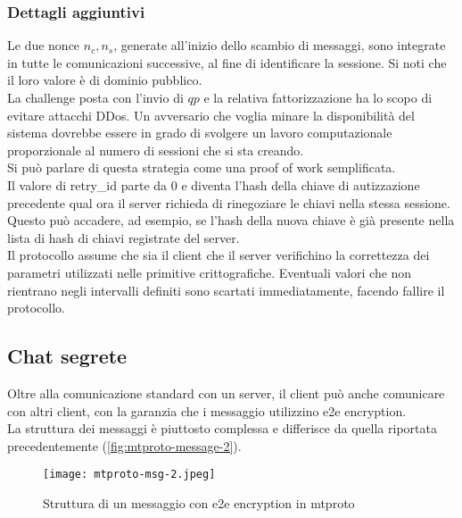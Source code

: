 

\subsubsection{Dettagli aggiuntivi}
Le due nonce $n_c, n_s$, generate all'inizio dello scambio di messaggi, sono integrate in tutte le comunicazioni successive,
al fine di identificare la sessione.
Si noti che il loro valore è di dominio pubblico. \\

La challenge posta con l'invio di $qp$ e la relativa fattorizzazione ha lo scopo di evitare attacchi DDos.
Un avversario che voglia minare la disponibilità del sistema dovrebbe essere in grado di svolgere un lavoro computazionale
proporzionale al numero di sessioni che si sta creando. \\
Si può parlare di questa strategia come una proof of work semplificata. \\

Il valore di retry\_id parte da 0 e diventa l'hash della chiave di autizzazione precedente qual ora il server
richieda di rinegoziare le chiavi nella stessa sessione.
Questo può accadere, ad esempio, se l'hash della nuova chiave è già presente nella lista di hash di chiavi registrate del server. \\

Il protocollo assume che sia il client che il server verifichino la correttezza dei parametri utilizzati nelle primitive crittografiche.
Eventuali valori che non rientrano negli intervalli definiti sono scartati immediatamente, facendo fallire il protocollo.

\subsection{Chat segrete}
Oltre alla comunicazione standard con un server, il client può anche comunicare con altri client, con la garanzia che i messaggio utilizzino \gls{e2e} encryption. \\
La struttura dei messaggi è piuttosto complessa e differisce da quella riportata precedentemente (\autoref{fig:mtproto-message-2}). \\

\begin{figure}[h]
    \texttt{[image: mtproto-msg-2.jpeg]}
    \caption{Struttura di un messaggio con \gls{e2e} encryption in \gls{mtproto} \cite{man:mtproto}} \label{fig:mtproto-message-2}
\end{figure}


